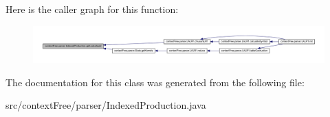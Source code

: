 Here is the caller graph for this function\-:\nopagebreak
\begin{figure}[H]
\begin{center}
\leavevmode
\includegraphics[width=350pt]{classcontext_free_1_1parser_1_1_indexed_production_a94e0e318a96518ee50607e682e7f0382_icgraph}
\end{center}
\end{figure}




The documentation for this class was generated from the following file\-:\begin{DoxyCompactItemize}
\item 
src/context\-Free/parser/Indexed\-Production.\-java\end{DoxyCompactItemize}
